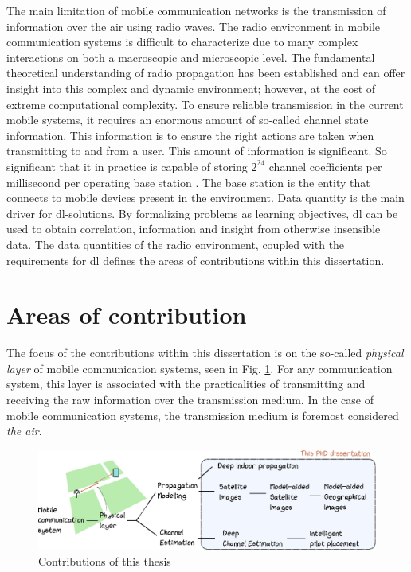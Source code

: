 The main limitation of mobile communication networks is the transmission of information over the air using radio waves. The radio environment in mobile communication systems is difficult to characterize due to many complex interactions on both a macroscopic and microscopic level. The fundamental theoretical understanding of radio propagation has been established and can offer insight into this complex and dynamic environment; however, at the cost of extreme computational complexity. To ensure reliable transmission in the current mobile systems, it requires an enormous amount of so-called channel state information. This information is to ensure the right actions are taken when transmitting to and from a user. This amount of information is significant. So significant that it in practice is capable of storing $2^{24}$ channel coefficients per millisecond per operating base station \cite{Studer2018}. The base station is the entity that connects to mobile devices present in the environment. Data quantity is the main driver for \acrlong{dl}-solutions.  By formalizing problems as learning objectives, \acrlong{dl} can be used to obtain correlation, information and insight from otherwise insensible data. The data quantities of the radio environment, coupled with the requirements for \acrlong{dl} defines the areas of contributions within this dissertation.


\section*{Areas of contribution}
The focus of the contributions within this dissertation is on the so-called \emph{physical layer} of mobile communication systems, seen in Fig. \ref{fig:areas_of_contribution}. For any communication system, this layer is associated with the practicalities of transmitting and receiving the raw information over the transmission medium. In the case of mobile communication systems, the transmission medium is foremost considered \emph{the air}. 


\begin{figure}
\includegraphics[width=\textwidth]{chapters/figures/intro_figure.eps}
\caption{Contributions of this thesis}\label{fig:areas_of_contribution}
\end{figure}

